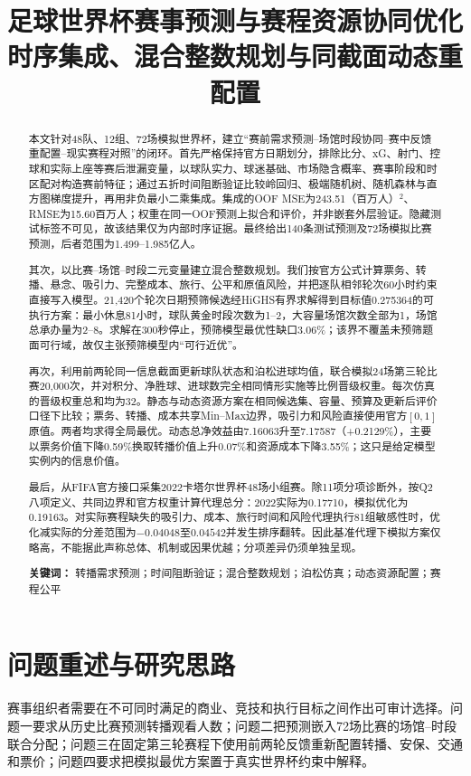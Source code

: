 \documentclass[UTF8,11pt,a4paper]{ctexart}
\title{\vspace{-1.8cm}\textbf{足球世界杯赛事预测与赛程资源协同优化}\\[0.3em]\large 时序集成、混合整数规划与同截面动态重配置}
\author{}
\date{}
\begin{document}
\thispagestyle{fancy}
\maketitle
\vspace{-1.4cm}
\begin{abstract}
本文针对48队、12组、72场模拟世界杯，建立“赛前需求预测--场馆时段协同--赛中反馈重配置--现实赛程对照”的闭环。首先严格保持官方日期划分，排除比分、xG、射门、控球和实际上座等赛后泄漏变量，以球队实力、球迷基础、市场隐含概率、赛事阶段和时区配对构造赛前特征；通过五折时间阻断验证比较岭回归、极端随机树、随机森林与直方图梯度提升，再用非负最小二乘集成。集成的OOF MSE为243.51（百万人）$^2$、RMSE为15.60百万人；权重在同一OOF预测上拟合和评价，并非嵌套外层验证。隐藏测试标签不可见，故该结果仅为内部时序证据。最终给出140条测试预测及72场模拟比赛预测，后者范围为1.499--1.985亿人。

其次，以比赛--场馆--时段二元变量建立混合整数规划。我们按官方公式计算票务、转播、悬念、吸引力、完整成本、旅行、公平和原值风险，并把逐队相邻轮次60小时约束直接写入模型。21,420个轮次日期预筛候选经HiGHS有界求解得到目标值0.275364的可执行方案：最小休息81小时，球队黄金时段次数为1--2，大容量场馆次数全部为1，场馆总承办量为2--8。求解在300秒停止，预筛模型最优性缺口3.06\%；该界不覆盖未预筛题面可行域，故仅主张预筛模型内“可行近优”。

再次，利用前两轮同一信息截面更新球队状态和泊松进球均值，联合模拟24场第三轮比赛20,000次，并对积分、净胜球、进球数完全相同情形实施等比例晋级权重。每次仿真的晋级权重总和均为32。静态与动态资源方案在相同候选集、容量、预算及更新后评价口径下比较；票务、转播、成本共享Min--Max边界，吸引力和风险直接使用官方$[0,1]$原值。两者均求得全局最优。动态总净效益由7.16063升至7.17587（+0.2129\%），主要以票务价值下降0.59\%换取转播价值上升0.07\%和资源成本下降3.55\%；这只是给定模型实例内的信息价值。

最后，从FIFA官方接口采集2022卡塔尔世界杯48场小组赛。除11项分项诊断外，按Q2八项定义、共同边界和官方权重计算代理总分：2022实际为0.17710，模拟优化为0.19163。对实际赛程缺失的吸引力、成本、旅行时间和风险代理执行81组敏感性时，优化减实际的分差范围为$-0.04048$至$0.04542$并发生排序翻转。因此基准代理下模拟方案仅略高，不能据此声称总体、机制或因果优越；分项差异仍须单独呈现。

\textbf{关键词：} 转播需求预测；时间阻断验证；混合整数规划；泊松仿真；动态资源配置；赛程公平
\end{abstract}
\newpage

\section{问题重述与研究思路}
赛事组织者需要在不可同时满足的商业、竞技和执行目标之间作出可审计选择。问题一要求从历史比赛预测转播观看人数；问题二把预测嵌入72场比赛的场馆--时段联合分配；问题三在固定第三轮赛程下使用前两轮反馈重新配置转播、安保、交通和票价；问题四要求把模拟最优方案置于真实世界杯约束中解释。
\end{document}
